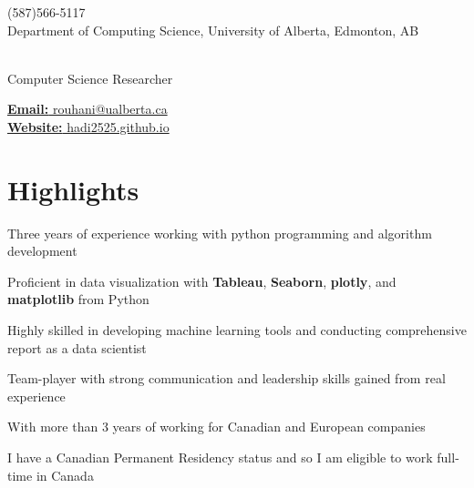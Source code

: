 \documentclass[letter,11pt]{article}
\author{Hadi Rohani} %
\makeatletter
\def\phone{(587)566-5117}
\def\city{Department of Computing Science, University of Alberta, Edmonton, AB}
\def\email{rouhani@ualberta.ca}
\def\Web{hadi2525.github.io}
\def\role{Computer Science Researcher} %
\makeatother
\begin{document}
\begin{center}
	\begin{minipage}[b]{.3\textwidth}
		\raggedright
		{\large \phone} \\ %
		{\city} %
		
	\end{minipage}%
	\begin{minipage}[b]{.4\textwidth}
		\makeatletter
		\centering {\HUGE \@author} \\
		\makeatother
		\vspace{.5em}
		{\color{highlight} \Large{\role}}
	\end{minipage}%
	\begin{minipage}[b]{.3\textwidth}
		\raggedleft 
		\href{mailto:\email}{\textbf{Email:} \email}\\ 
		\href{https://hadi2525.github.io/\Web}{\textbf{Website:} \Web}
	\end{minipage}

\end{center}
\vspace{-0.75em}	
\section{Highlights}
\begin{zitemize}
	\item Three years of experience working with python programming and algorithm development
	\item Proficient in data visualization with \textbf{Tableau}, \textbf{Seaborn}, \textbf{plotly}, and \textbf{matplotlib} from Python
	\item Highly skilled in developing machine learning tools and conducting comprehensive report as a data scientist
	\item Team-player with strong communication and leadership skills gained from real experience
	\item With more than 3 years of working for Canadian and European companies
	\item I have a Canadian Permanent Residency status and so I am eligible to work full-time in Canada
\end{zitemize}
\end{document}
